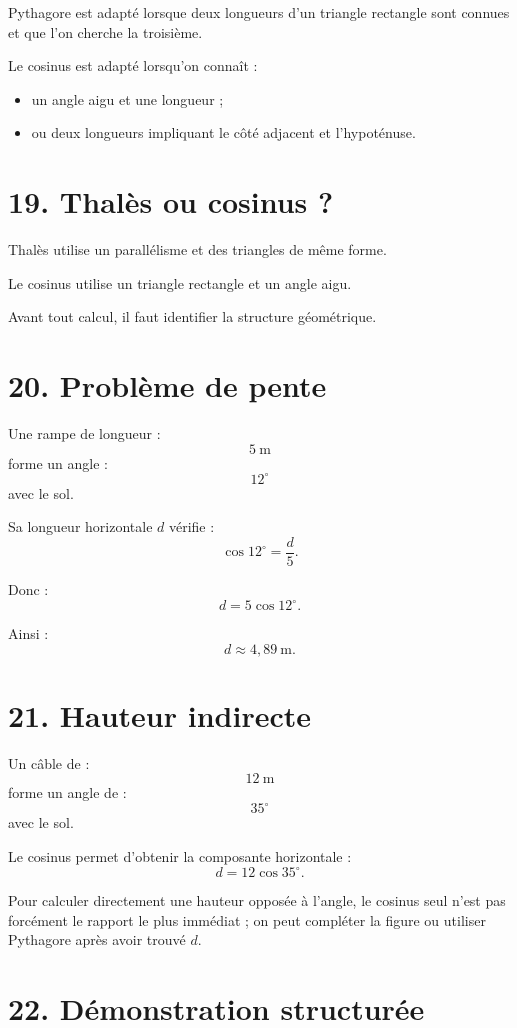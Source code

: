 Pythagore est adapté lorsque deux longueurs d'un triangle rectangle sont connues et que l'on cherche la troisième.

Le cosinus est adapté lorsqu'on connaît :
\begin{itemize}
\item un angle aigu et une longueur ;
\item ou deux longueurs impliquant le côté adjacent et l'hypoténuse.
\end{itemize}

\section{19. Thalès ou cosinus ?}

Thalès utilise un parallélisme et des triangles de même forme.

Le cosinus utilise un triangle rectangle et un angle aigu.

Avant tout calcul, il faut identifier la structure géométrique.

\section{20. Problème de pente}

Une rampe de longueur :
\[
5\ \text{m}
\]
forme un angle :
\[
12^\circ
\]
avec le sol.

Sa longueur horizontale $d$ vérifie :
\[
\cos12^\circ=\dfrac d5.
\]

Donc :
\[
d=5\cos12^\circ.
\]

Ainsi :
\[
d\approx4{,}89\ \text{m}.
\]

\section{21. Hauteur indirecte}

Un câble de :
\[
12\ \text{m}
\]
forme un angle de :
\[
35^\circ
\]
avec le sol.

Le cosinus permet d'obtenir la composante horizontale :
\[
d=12\cos35^\circ.
\]

Pour calculer directement une hauteur opposée à l'angle, le cosinus seul n'est pas forcément le rapport le plus immédiat ; on peut compléter la figure ou utiliser Pythagore après avoir trouvé $d$.

\section{22. Démonstration structurée}

